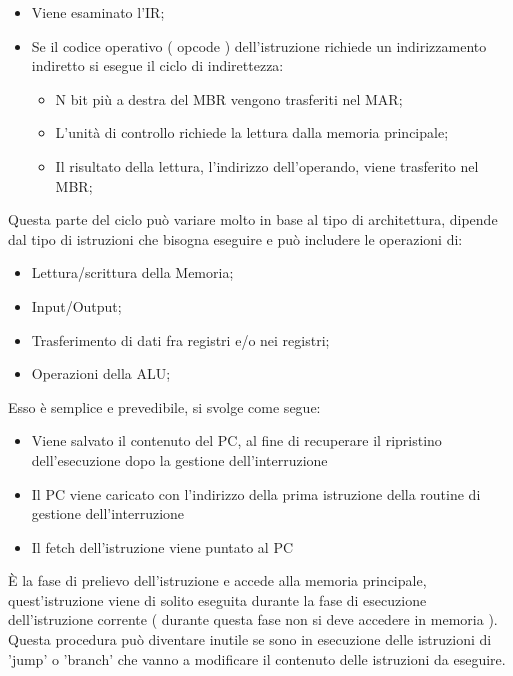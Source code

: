 \documentclass[arch.tex]{subfiles}
\begin{document}
\begin{itemize}
	\item Viene esaminato l'IR;
	\item Se il codice operativo ( opcode ) dell'istruzione richiede un indirizzamento indiretto
		si esegue il ciclo di indirettezza:
		\begin{itemize}
			\item N bit più a destra del MBR vengono trasferiti nel MAR;
			\item L'unità di controllo richiede la lettura dalla memoria principale;
			\item Il risultato della lettura, l'indirizzo dell'operando, viene trasferito
				nel MBR;
		\end{itemize}
\end{itemize}

%
\label{par:execute}
Questa parte del ciclo può variare molto in base al tipo di architettura, dipende dal tipo 
di istruzioni che bisogna eseguire e può includere le operazioni di:

\begin{itemize}
	\item Lettura/scrittura della Memoria;
	\item Input/Output;
	\item Trasferimento di dati fra registri e/o nei registri;
	\item Operazioni della ALU;
\end{itemize}

%
\label{par:interrupt}
Esso è semplice e prevedibile, si svolge come segue:

\begin{itemize}
	\item Viene salvato il contenuto del PC, al fine di recuperare 
		il ripristino dell'esecuzione dopo
		la gestione dell'interruzione
	\item Il PC viene caricato con l'indirizzo della prima istruzione 
		della routine di gestione dell'interruzione
	\item Il fetch dell'istruzione viene puntato al PC
\end{itemize}

%
\label{par:prefetch}
È la fase di prelievo dell'istruzione e accede alla memoria principale, quest'istruzione viene di solito
eseguita durante la fase di esecuzione dell'istruzione corrente ( durante questa fase non si deve accedere in memoria ).\\
Questa procedura può diventare inutile se sono in esecuzione delle istruzioni di 'jump' o 'branch' che vanno
a modificare il contenuto delle istruzioni da eseguire.
\end{document}
